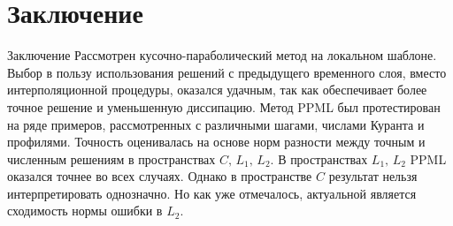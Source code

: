 \documentclass[unicode, 8pt]{beamer}
\begin{document}
    \section{Заключение}
    \begin{frame}{Заключение}
        Рассмотрен кусочно-параболический метод на локальном шаблоне. Выбор в пользу использования решений с предыдущего временного слоя, вместо интерполяционной процедуры, оказался удачным, так как обеспечивает более точное решение и уменьшенную диссипацию. Метод PPML был протестирован на ряде примеров, рассмотренных с различными шагами, числами Куранта и профилями. Точность оценивалась на основе норм разности между точным и численным решениям в пространствах $ C,\, L_1,\, L_2 $. В пространствах $L_1, \, L_2$ PPML оказался точнее во всех случаях. Однако в пространстве $C$ результат нельзя интерпретировать однозначно. Но как уже отмечалось, актуальной является сходимость нормы ошибки в $L_2$.
    \end{frame}
\end{document}
